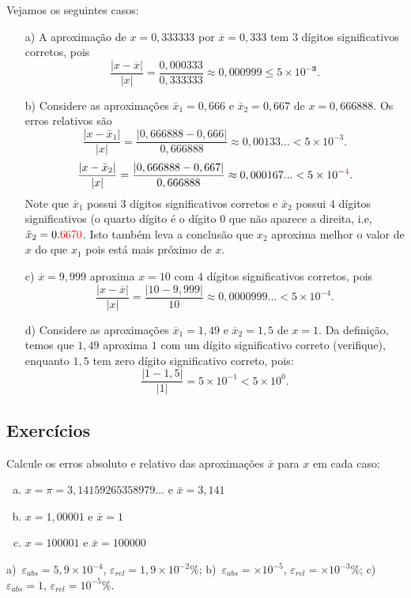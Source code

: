 \begin{ex} Vejamos os seguintes casos:
\begin{itemize}
\item[a)] A aproximação de $x=0,333333$ por $\overline{x}=0,333$ tem $3$ dígitos significativos corretos, pois
  \begin{equation}
    \frac{|x-\overline{x}|}{|x|} = \frac{0,000333}{0,333333} \approx 0,000999 \leq 5\times 10^{-\pmb{3}}.
  \end{equation}
\item[b)] Considere as aproximações $\bar{x}_1=0,666$ e $\bar{x}_2=0,667$ de $x=0,666888$. Os erros relativos são
  $$
    \frac{|x-\bar{x}_1|}{|x|} = \frac{|0,666888-0,666|}{0,666888} \approx 0,00133...< 5\times 10^{-3}.
  $$
  $$
    \frac{|x-\bar{x}_2|}{|x|} = \frac{|0,666888-0,667|}{0,666888} \approx 0,000167...< 5\times 10^{-{\color{red}{4}}}.
  $$
  Note que $\bar{x}_1$ possui $3$ dígitos significativos corretos e $\bar{x}_2$ possui $4$ dígitos significativos (o quarto dígito é o dígito $0$ que não aparece a direita, i.e, $\bar{x}_2=0.{\color{red}{6670}}$. Isto também leva a conclusão que $x_2$ aproxima melhor o valor de $x$ do que $x_1$ pois está mais próximo de $x$.

\item[c)] $\overline{x} = 9,999$ aproxima $x = 10$ com $4$ dígitos significativos corretos, pois
  \begin{equation}
    \frac{|x-\overline{x}|}{|x|} = \frac{|10 - 9,999|}{10} \approx 0,0000999...< 5\times 10^{-4}.
  \end{equation}
\item[d)] Considere as aproximações $\overline{x}_1 = 1,49$ e $\overline{x}_2 = 1,5$ de $x = 1$. Da definição, temos que $1,49$ aproxima $1$ com um dígito significativo correto (verifique), enquanto $1,5$ tem zero dígito significativo correto, pois:
  \begin{equation}
    \frac{|1-1,5|}{|1|} = 5\times 10^{-1} < 5\times 10^{0}.
  \end{equation}
\end{itemize}
\end{ex}

\subsection*{Exercícios}

\begin{exer} Calcule os erros absoluto e relativo das aproximações $\bar{x}$ para $x$ em cada caso:
  \begin{enumerate}[a)]
  \item $x=\pi=3,14159265358979\ldots$ e $\bar{x}=3,141$
  \item $x=1,00001$ e $\bar{x}=1$
  \item $x=100001$ e $\bar{x}=100000$
  \end{enumerate}
\end{exer}
\begin{resp}
  a)~$\varepsilon_{abs} = 5,9\times 10^{-4}$, $\varepsilon_{rel} = 1,9\times 10^{-2}\%$; b)~$\varepsilon_{abs} = \times 10^{-5}$, $\varepsilon_{rel} = \times 10^{-3}\%$; c)~$\varepsilon_{abs} = 1$, $\varepsilon_{rel} = 10^{-5}\%$.
\end{resp}


